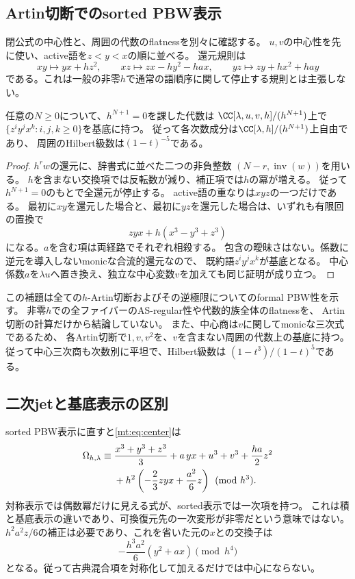 \subsection{Artin切断でのsorted PBW表示}

閉公式の中心性と、周囲の代数のflatnessを別々に確認する。
$u,v$の中心性を先に使い、active語を$z<y<x$の順に並べる。
還元規則は
\begin{equation}\label{mt:eq:rewrite}
 xy\longmapsto yx+hz^2,\qquad
 xz\longmapsto zx-hy^2-hax,\qquad
 yz\longmapsto zy+hx^2+hay
\end{equation}
である。これは一般の非零$h$で通常の語順序に関して停止する規則とは主張しない。

\begin{lemma}[全Artin切断でのPBW性]
\label{mt:lem:artin-pbw}
任意の$N\ge0$について、$h^{N+1}=0$を課した代数は
$\CC[\lambda,u,v,h]/(h^{N+1})$上で
$\{z^iy^jx^k:i,j,k\ge0\}$を基底に持つ。
従って各次数成分は$\CC[\lambda,h]/(h^{N+1})$上自由であり、
周囲のHilbert級数は$(1-t)^{-5}$である。
\end{lemma}
\begin{proof}
$h^r w$の還元に、辞書式に並べた二つの非負整数
$(N-r,\operatorname{inv}(w))$を用いる。
$h$を含まない交換項では反転数が減り、補正項では$h$の冪が増える。
従って$h^{N+1}=0$のもとで全還元が停止する。
active語の重なりは$xyz$の一つだけである。
最初に$xy$を還元した場合と、最初に$yz$を還元した場合は、いずれも有限回の置換で
\begin{equation}\label{mt:eq:overlap}
 zyx+h(x^3-y^3+z^3)
\end{equation}
になる。$a$を含む項は両経路でそれぞれ相殺する。
包含の曖昧さはない。係数に逆元を導入しないmonicな合流的還元なので、
既約語$z^iy^jx^k$が基底となる。
中心係数$a$を$\lambda u$へ置き換え、独立な中心変数$v$を加えても同じ証明が成り立つ。
\end{proof}

この補題は全ての$h$-Artin切断およびその逆極限についてのformal PBW性を示す。
非零$h$での全ファイバーのAS-regular性や代数的族全体のflatnessを、
Artin切断の計算だけから結論していない。
また、中心商は$v$に関してmonicな三次式であるため、
各Artin切断で$1,v,v^2$を、$v$を含まない周囲の代数上の基底に持つ。
従って中心三次商も次数別に平坦で、Hilbert級数は
$(1-t^3)/(1-t)^5$である。

\subsection{二次jetと基底表示の区別}

sorted PBW表示に直すと\eqref{mt:eq:center}は
\begin{align}\label{mt:eq:second-jet}
 \Omega_{h,\lambda}\equiv{}&
 \frac{x^3+y^3+z^3}{3}+a\,yx+u^3+v^3
 +\frac{ha}{2}z^2\notag\\
 &+h^2\left(-\frac23zyx+\frac{a^2}{6}z\right)
 \pmod{h^3}.
\end{align}
対称表示では偶数冪だけに見える式が、sorted表示では一次項を持つ。
これは積と基底表示の違いであり、可換復元先の一次変形が非零だという意味ではない。
$h^2a^2z/6$の補正は必要であり、これを省いた元の$x$との交換子は
\[
 -\frac{h^3a^2}{6}(y^2+ax)\pmod{h^4}
\]
となる。従って古典混合項を対称化して加えるだけでは中心にならない。

